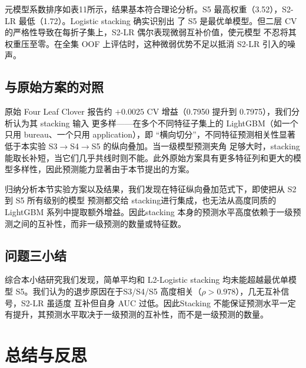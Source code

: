\documentclass[12pt,UTF8,fontset=windows]{ctexart}
\begin{document}
元模型系数排序如表11所示，结果基本符合理论分析。S5 最高权重（3.52），S2-LR 最低（1.72）。Logistic stacking 确实识别出
了 S5 是最优单模型。但二层 CV 的严格性导致在每折子集上，S2-LR 偶尔表现微弱互补价值，使元模型
不忍将其权重压至零。在全集 OOF 上评估时，这种微弱优势不足以抵消 S2-LR 引入的噪声。

\subsection{与原始方案的对照}

原始 Four Leaf Clover 报告约 $+0.0025$ CV 增益（0.7950 提升到 0.7975），我们分析认为其 stacking 输入
更多样——在多个不同特征子集上的 LightGBM（如一个只用 bureau、一个只用 application），即
“横向切分”，不同特征预测相关性显著低于本实验 S3$\to$S4$\to$S5 的纵向叠加。当一级模型预测夹角
足够大时，stacking 能取长补短，当它们几乎共线时则不能。此外原始方案具有更多特征列和更大的模型多样性，因此预测能力显著由于本节提出的方案。

归纳分析本节实验方案以及结果，我们发现在特征纵向叠加范式下，即使把从 S2 到 S5 所有级别的模型
预测都交给 stacking进行集成，也无法从高度同质的 LightGBM 系列中提取额外增益。因此stacking 本身的预测水平高度依赖于一级预测之间的互补性，而非一级预测的数量或特征数。

\subsection{问题三小结}

综合本小结研究我们发现，简单平均和 L2-Logistic stacking 均未能超越最优单模型 S5。我们认为的退步原因在于S3/S4/S5 高度相关（$\rho>0.978$），几无互补信号，S2-LR 虽适度
互补但自身 AUC 过低。因此Stacking 不能保证预测水平一定有提升，其预测水平取决于一级预测的互补性，而不是一级预测的数量。

\section{总结与反思}
\end{document}
